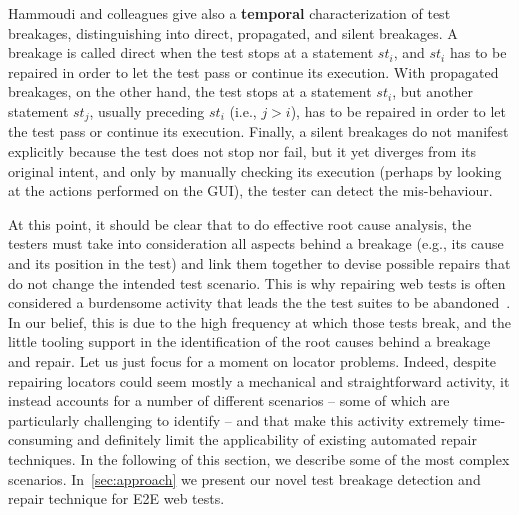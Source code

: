 Hammoudi and colleagues give also a \textbf{temporal} characterization of test breakages, distinguishing into direct, propagated, and silent breakages. A breakage is called direct when the test stops at a statement $st_i$, and $st_i$ has to be repaired in order to let the test pass or continue its execution. With propagated breakages, on the other hand, the test stops at a statement $st_i$, but another statement $st_j$, usually preceding $st_i$ (i.e., $j > i$), has to be repaired in order to let the test pass or continue its execution. Finally, a silent breakages do not manifest explicitly because the test does not stop nor fail, but it yet diverges from its original intent, and only by manually checking its execution (perhaps by looking at the actions performed on the GUI), the tester can detect the mis-behaviour.

At this point, it should be clear that to do effective root cause analysis, the testers must take into consideration all aspects behind a breakage (e.g., its cause and its position in the test) and link them together to devise possible repairs that do not change the intended test scenario. This is why repairing web tests is often considered a burdensome activity that leads the the test suites to be abandoned~\cite{Christophe2014}. In our belief, this is due to the high frequency at which those tests break, and the little tooling support in the identification of the root causes behind a breakage and repair.
%
Let us just focus for a moment on locator problems. Indeed, despite repairing locators could seem mostly a mechanical and straightforward activity, it instead accounts for a number of different scenarios -- some of which are particularly challenging to identify -- and that make this activity extremely time-consuming and 
definitely limit the applicability of existing automated repair techniques. In the following of this section, we describe some of the most complex scenarios. In~\autoref{sec:approach} we present our novel test breakage detection and repair technique for E2E web tests.


